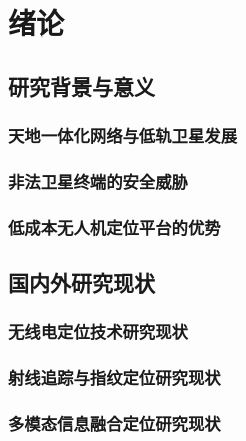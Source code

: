 \chapter{绪论}

\section{研究背景与意义}

\subsection{天地一体化网络与低轨卫星发展}


\subsection{非法卫星终端的安全威胁}


\subsection{低成本无人机定位平台的优势}


\section{国内外研究现状}

\subsection{无线电定位技术研究现状}


\subsection{射线追踪与指纹定位研究现状}


\subsection{多模态信息融合定位研究现状}

